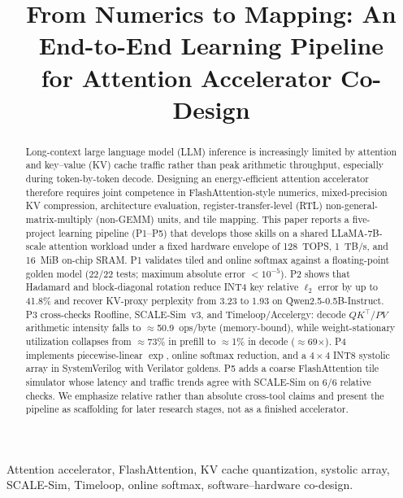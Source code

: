 \documentclass[conference]{IEEEtran}
\begin{document}
\title{From Numerics to Mapping: An End-to-End Learning Pipeline\\
for Attention Accelerator Co-Design}

\author{
}

\maketitle

\begin{abstract}
Long-context large language model (LLM) inference is increasingly limited by attention and key--value (KV) cache traffic rather than peak arithmetic throughput, especially during token-by-token decode.
Designing an energy-efficient attention accelerator therefore requires joint competence in FlashAttention-style numerics, mixed-precision KV compression, architecture evaluation, register-transfer-level (RTL) non-general-matrix-multiply (non-GEMM) units, and tile mapping.
This paper reports a five-project learning pipeline (P1--P5) that develops those skills on a shared LLaMA-7B-scale attention workload under a fixed hardware envelope of 128~TOPS, 1~TB/s, and 16~MiB on-chip SRAM.
P1 validates tiled and online softmax against a floating-point golden model (22/22 tests; maximum absolute error $<10^{-5}$).
P2 shows that Hadamard and block-diagonal rotation reduce INT4 key relative $\ell_2$ error by up to 41.8\% and recover KV-proxy perplexity from 3.23 to 1.93 on Qwen2.5-0.5B-Instruct.
P3 cross-checks Roofline, SCALE-Sim~v3, and Timeloop/Accelergy: decode $QK^\top$/$PV$ arithmetic intensity falls to $\approx$50.9~ops/byte (memory-bound), while weight-stationary utilization collapses from $\approx$73\% in prefill to $\approx$1\% in decode ($\approx$69$\times$).
P4 implements piecewise-linear $\exp$, online softmax reduction, and a $4\times4$ INT8 systolic array in SystemVerilog with Verilator goldens.
P5 adds a coarse FlashAttention tile simulator whose latency and traffic trends agree with SCALE-Sim on 6/6 relative checks.
We emphasize relative rather than absolute cross-tool claims and present the pipeline as scaffolding for later research stages, not as a finished accelerator.
\end{abstract}

\begin{IEEEkeywords}
Attention accelerator, FlashAttention, KV cache quantization, systolic array, SCALE-Sim, Timeloop, online softmax, software--hardware co-design.
\end{IEEEkeywords}
\end{document}
